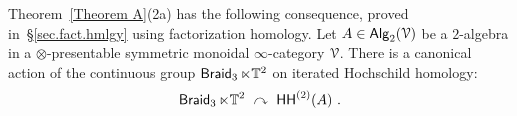 \documentclass{amsart}
\newenvironment{mythm}[1]
  {\renewcommand\theinnercustomthm{#1}\innercustomthm}
  {\endinnercustomthm}
\theoremstyle{definition}
\theoremstyle{remark}
\DeclareMathOperator{\Alg}{\sf Alg}
\newcommand{\lacts}{\curvearrowright}
\def\ot{\otimes}
\newcommand{\lag}{\langle}
\newcommand{\rag}{\rangle}
\newcommand{\w}{\widetilde}
\newcommand{\xla}{\xleftarrow}
\DeclareMathOperator{\Braid}{{\sf Braid}_3}
\DeclareMathOperator{\Ebraid}{\w{\sf E}_{2}^{+}(\ZZ)}
\DeclareMathOperator{\HHt}{{\sf HH}^{(2)}}
\begin{document}
Theorem~\ref{Theorem A}(2a) has the following consequence, proved in~\S\ref{sec.fact.hmlgy} using factorization homology.
\begin{mythm}{B.1} %
\label{t36}
Let $A \in \Alg_2(\cV) $ be a $2$-algebra in a $\ot$-presentable symmetric monoidal $\infty$-category $\mathcal V$.
%
There is a canonical action of the continuous group $\Braid \ltimes \TT^2$ on iterated Hochschild homology:
\begin{equation}
\label{e49}
\Braid \ltimes \TT^2
~\lacts~
\HHt(A)
~.
\end{equation}
%
%
%
%
%
%
%
%
%



%
%


\end{mythm}
\end{document}

